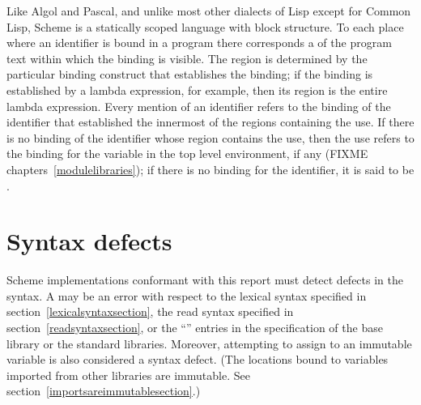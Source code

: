 \vest Like Algol and Pascal, and unlike most other dialects of Lisp
except for Common Lisp, Scheme is a statically scoped language with
block structure.  To each place where an identifier is bound in a program
there corresponds a  of the program text within which
the binding is visible.  The region is determined by the particular
binding construct that establishes the binding; if the binding is
established by a {\cf lambda} expression, for example, then its region
is the entire {\cf lambda} expression.  Every mention of an identifier
refers to the binding of the identifier that established the
innermost of the regions containing the use.  If there is no binding of
the identifier whose region contains the use, then the use refers to the
binding for the variable in the top level environment, if any
(FIXME chapters~\ref{modulelibraries}); if there is no
binding for the identifier,
it is said to be .




\section{Syntax defects}

Scheme implementations conformant with this report must detect
defects in the syntax.  A  may be an error with
respect to the lexical syntax specified in
section~\ref{lexicalsyntaxsection}, the read syntax specified in
section~\ref{readsyntaxsection}, or the ``\exprtype'' entries in the
specification of the base library or the standard libraries.
Moreover, attempting to assign to an immutable variable is also
considered a syntax defect.  (The locations bound to variables
imported from other libraries are immutable.  See
section~\ref{importsareimmutablesection}.)

